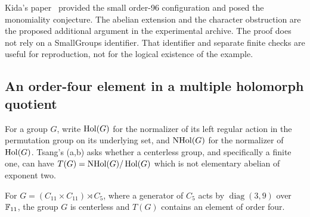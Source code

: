 Kida's paper~\cite{kida} provided the small order-96 configuration
and posed the monomiality conjecture. The abelian extension and
the character obstruction are the proposed additional argument
in the experimental archive. The proof does not rely on a
SmallGroups identifier. That identifier and separate finite
checks are useful for reproduction, not for the logical
existence of the example.

\subsection{An order-four element in a multiple holomorph quotient}
\label{subsec:holomorph}

For a group $G$, write $\operatorname{Hol}(G)$ for the normalizer of its
left regular action in the permutation group on its underlying
set, and $\operatorname{NHol}(G)$ for the normalizer of $\operatorname{Hol}(G)$.
Tsang's (a,b) asks whether a centerless group,
and specifically a finite one, can have
$T(G)=\operatorname{NHol}(G)/\operatorname{Hol}(G)$ which is not elementary abelian of
exponent two.

\begin{theorem}
\label{thm:holomorph}
For $G=(C_{11}\times C_{11})\rtimes C_5$, where a generator
of $C_5$ acts by $\operatorname{diag}(3,9)$ over $\mathbb F_{11}$,
the group $G$ is centerless and $T(G)$ contains an element
of order four.
\end{theorem}


